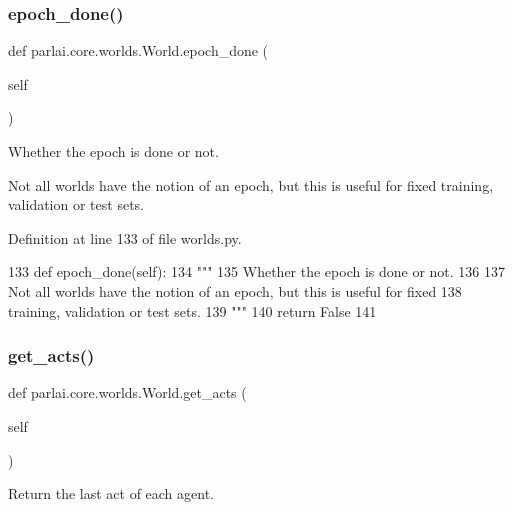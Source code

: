 \subsubsection{\texorpdfstring{epoch\+\_\+done()}{epoch\_done()}}
{\footnotesize\ttfamily def parlai.\+core.\+worlds.\+World.\+epoch\+\_\+done (\begin{DoxyParamCaption}\item[{}]{self }\end{DoxyParamCaption})}

\begin{DoxyVerb}Whether the epoch is done or not.

Not all worlds have the notion of an epoch, but this is useful for fixed
training, validation or test sets.
\end{DoxyVerb}
 

Definition at line 133 of file worlds.\+py.


\begin{DoxyCode}
133     \textcolor{keyword}{def }epoch\_done(self):
134         \textcolor{stringliteral}{"""}
135 \textcolor{stringliteral}{        Whether the epoch is done or not.}
136 \textcolor{stringliteral}{}
137 \textcolor{stringliteral}{        Not all worlds have the notion of an epoch, but this is useful for fixed}
138 \textcolor{stringliteral}{        training, validation or test sets.}
139 \textcolor{stringliteral}{        """}
140         \textcolor{keywordflow}{return} \textcolor{keyword}{False}
141 
\end{DoxyCode}
\mbox{\label{classparlai_1_1core_1_1worlds_1_1World_aa1d3c0cc946f5ade27373f7dc0bd77b5}} 
\subsubsection{\texorpdfstring{get\+\_\+acts()}{get\_acts()}}
{\footnotesize\ttfamily def parlai.\+core.\+worlds.\+World.\+get\+\_\+acts (\begin{DoxyParamCaption}\item[{}]{self }\end{DoxyParamCaption})}

\begin{DoxyVerb}Return the last act of each agent.
\end{DoxyVerb}
 


